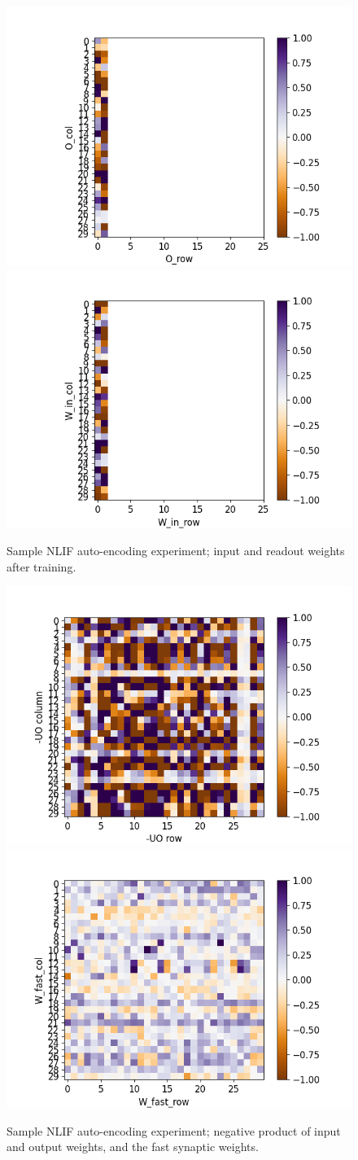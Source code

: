 \documentclass[mphil,deptreport,ianc]{infthesis} %
\begin{document}
\begin{figure}[!h]
    \centering
    \includegraphics[width=0.49\columnwidth]{figures/Supplementary/gating/NLIF/AutoEncoding/01-04_16-42-46-568/test_heatmap_2_O_T.png}
    \includegraphics[width=0.49\columnwidth]{figures/Supplementary/gating/NLIF/AutoEncoding/01-04_16-42-46-568/test_heatmap_2_W_in.png}
    \caption{Sample NLIF auto-encoding experiment; input and readout weights after training.}
    \label{fig:NLIF_AE_1_O_W_in}
\end{figure}

\begin{figure}[!h]
    \centering
    \includegraphics[width=0.49\columnwidth]{figures/Supplementary/gating/NLIF/AutoEncoding/01-04_16-42-46-568/test_heatmap_compare_minUO.png}
    \includegraphics[width=0.49\columnwidth]{figures/Supplementary/gating/NLIF/AutoEncoding/01-04_16-42-46-568/test_heatmap_compare_W_fast.png}
    \caption{Sample NLIF auto-encoding experiment; negative product of input and output weights, and the fast synaptic weights.}
    \label{fig:NLIF_AE_1_neg_UO_W_fast}
\end{figure}
\end{document}

